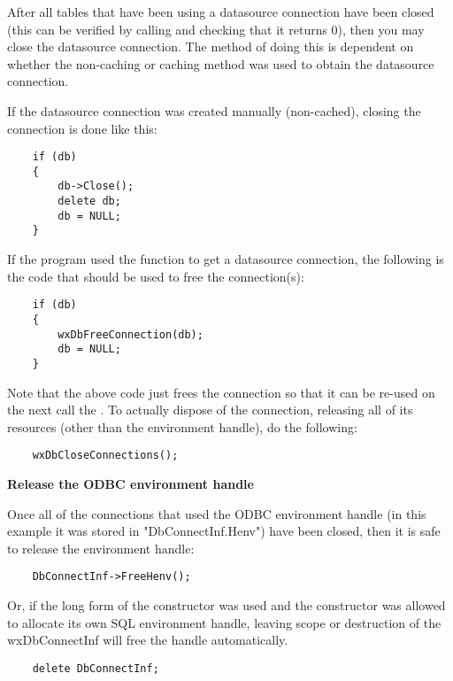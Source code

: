 After all tables that have been using a datasource connection have been 
closed (this can be verified by calling  
and checking that it returns 0), then you may close the datasource 
connection. The method of doing this is dependent on whether the 
non-caching or caching method was used to obtain the datasource connection.

If the datasource connection was created manually (non-cached), closing the 
connection is done like this:

\begin{verbatim}
    if (db)
    {
        db->Close();
        delete db;
        db = NULL;
    }
\end{verbatim}

If the program used the  function to get a datasource 
connection, the following is the code that should be used to free the 
connection(s):

\begin{verbatim}
    if (db)
    {
        wxDbFreeConnection(db);
        db = NULL;
    }
\end{verbatim}

Note that the above code just frees the connection so that it can be 
re-used on the next call the . To actually dispose 
of the connection, releasing all of its resources (other than the 
environment handle), do the following:

\begin{verbatim}
    wxDbCloseConnections();
\end{verbatim}

{\bf Release the ODBC environment handle}

Once all of the connections that used the ODBC environment handle (in 
this example it was stored in "DbConnectInf.Henv") have been closed, then 
it is safe to release the environment handle:

\begin{verbatim}
    DbConnectInf->FreeHenv();
\end{verbatim}

Or, if the long form of the constructor was used and the constructor was allowed 
to allocate its own SQL environment handle, leaving scope or destruction of the 
wxDbConnectInf will free the handle automatically.

\begin{verbatim}
    delete DbConnectInf;
\end{verbatim}

